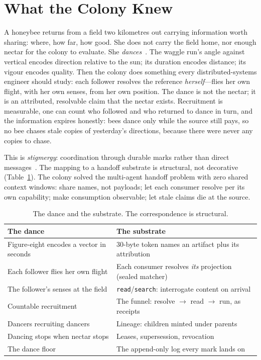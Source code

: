 \documentclass[10pt,twocolumn]{article}
\newcommand{\tok}[1]{\texttt{#1}}
\begin{document}
\section{What the Colony Knew}
\label{sec:bees}

A honeybee returns from a field two kilometres out carrying information
worth sharing: where, how far, how good. She does not carry the field
home, nor enough nectar for the colony to evaluate. She
\emph{dances}~\citep{vonfrisch1967}. The waggle run's angle against
vertical encodes direction relative to the sun; its duration encodes
distance; its vigour encodes quality. Then the colony does something every
distributed-systems engineer should study: each follower resolves the
reference \emph{herself}---flies her own flight, with her own senses, from
her own position. The dance is not the nectar; it is an attributed,
resolvable claim that the nectar exists. Recruitment is measurable, one can
count who followed and who returned to dance in turn, and the information
expires honestly: bees dance only while the source still pays, so no bee
chases stale copies of yesterday's directions, because there were never
any copies to chase.

This is \emph{stigmergy}: coordination through durable marks rather than
direct messages~\citep{grasse1959,theraulaz1999}. The mapping to a handoff
substrate is structural, not decorative (Table~\ref{tab:mapping}). The
colony solved the multi-agent handoff problem with zero shared context
windows: share names, not payloads; let each consumer resolve per its own
capability; make consumption observable; let stale claims die at the
source.

\begin{table}[t]
\centering
\small
\caption{The dance and the substrate. The correspondence is structural.}
\label{tab:mapping}
\renewcommand{\arraystretch}{1.2}
\begin{tabular}{@{}p{3.7cm}p{4.0cm}@{}}
\toprule
\textbf{The dance} & \textbf{The substrate}\\
\midrule
Figure-eight encodes a vector in seconds & 30-byte token names an artifact plus its attribution\\
Each follower flies her own flight & Each consumer resolves \emph{its} projection (sealed matcher)\\
The follower's senses at the field & \tok{read}/\tok{search}: interrogate content on arrival\\
Countable recruitment & The funnel: resolve $\to$ read $\to$ run, as receipts\\
Dancers recruiting dancers & Lineage: children minted under parents\\
Dancing stops when nectar stops & Leases, supersession, revocation\\
The dance floor & The append-only log every mark lands on\\
\bottomrule
\end{tabular}
\end{table}
\end{document}
